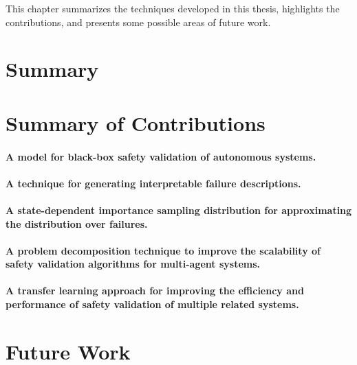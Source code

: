 This chapter summarizes the techniques developed in this thesis, highlights the contributions, and presents some possible areas of future work.

\section{Summary}

\section{Summary of Contributions}

\paragraph{A model for black-box safety validation of autonomous systems.} %
\paragraph{A technique for generating interpretable failure descriptions.} %
\paragraph{A state-dependent importance sampling distribution for approximating the distribution over failures.} %

\paragraph{A problem decomposition technique to improve the scalability of safety validation algorithms for multi-agent systems.} %

\paragraph{A transfer learning approach for improving the efficiency and performance of safety validation of multiple related systems.} %

\section{Future Work}

